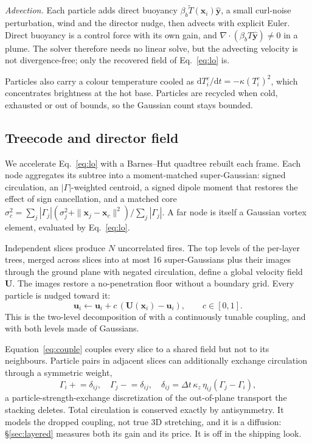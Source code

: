 \documentclass[acmtog,nonacm]{acmart}
\newcommand{\bx}{\mathbf{x}}
\newcommand{\bu}{\mathbf{u}}
\begin{document}
\emph{Advection.} Each particle adds direct buoyancy $\beta_b\tilde T(\bx_i)\hat{\mathbf y}$, a small curl-noise perturbation, wind and the director nudge, then advects with explicit Euler. Direct buoyancy is a control force with its own gain, and $\nabla\cdot(\beta_bT\hat{\mathbf y})\neq0$ in a plume. The solver therefore needs no linear solve, but the advecting velocity is not divergence-free; only the recovered field of Eq.~\ref{eq:lo} is.

Particles also carry a colour temperature cooled as $\mathrm dT^c_i/\mathrm dt=-\kappa(T^c_i)^2$, which concentrates brightness at the hot base. Particles are recycled when cold, exhausted or out of bounds, so the Gaussian count stays bounded.

\subsection{Treecode and director field}
\label{sec:treecode-method}
We accelerate Eq.~\ref{eq:lo} with a Barnes--Hut quadtree \cite{barnes1986} rebuilt each frame. Each node aggregates its subtree into a moment-matched super-Gaussian: signed circulation, an $|\Gamma|$-weighted centroid, a signed dipole moment that restores the effect of sign cancellation, and a matched core $\sigma_c^2=\sum_j|\Gamma_j|(\sigma_j^2+\|\bx_j-\bx_c\|^2)/\sum_j|\Gamma_j|$. A far node is itself a Gaussian vortex element, evaluated by Eq.~\ref{eq:lo}.

Independent slices produce $N$ uncorrelated fires. The top levels of the per-layer trees, merged across slices into at most 16 super-Gaussians plus their images through the ground plane with negated circulation, define a global velocity field $\mathbf U$. The images restore a no-penetration floor without a boundary grid. Every particle is nudged toward it:
\begin{equation}
\bu_i\leftarrow\bu_i+c\,(\mathbf U(\bx_i)-\bu_i),\qquad c\in[0,1].
\label{eq:couple}
\end{equation}
This is the two-level decomposition of \citet{horvath2009} with a continuously tunable coupling, and with both levels made of Gaussians.

Equation~\ref{eq:couple} couples every slice to a shared field but not to its neighbours. Particle pairs in adjacent slices can additionally exchange circulation through a symmetric weight,
\begin{equation}
\Gamma_i\mathrel{+}=\delta_{ij},\quad\Gamma_j\mathrel{-}=\delta_{ij},\quad\delta_{ij}=\Delta t\,\kappa_z\,\eta_{ij}(\Gamma_j-\Gamma_i),
\label{eq:pse}
\end{equation}
a particle-strength-exchange discretization \cite{degond1989} of the out-of-plane transport the stacking deletes. Total circulation is conserved exactly by antisymmetry. It models the dropped coupling, not true 3D stretching, and it is a diffusion: \S\ref{sec:layered} measures both its gain and its price. It is off in the shipping look.
\end{document}

